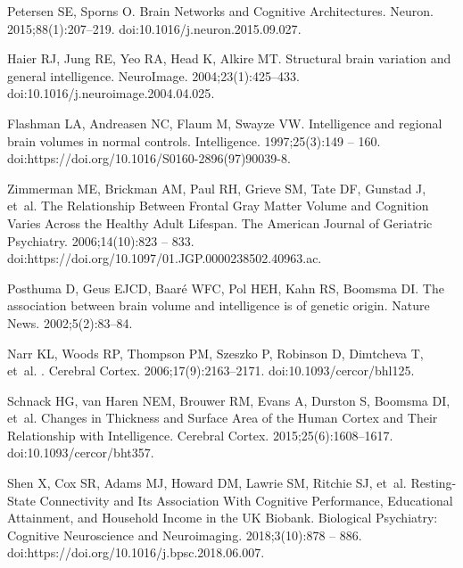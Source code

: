 \documentclass[10pt,letterpaper]{article}
\begin{document}
\begin{thebibliography}{10}

Petersen SE, Sporns O.
\newblock Brain Networks and Cognitive Architectures.
\newblock Neuron. 2015;88(1):207--219.
\newblock doi:{10.1016/j.neuron.2015.09.027}.

Haier RJ, Jung RE, Yeo RA, Head K, Alkire MT.
\newblock Structural brain variation and general intelligence.
\newblock NeuroImage. 2004;23(1):425--433.
\newblock doi:{10.1016/j.neuroimage.2004.04.025}.

Flashman LA, Andreasen NC, Flaum M, Swayze VW.
\newblock Intelligence and regional brain volumes in normal controls.
\newblock Intelligence. 1997;25(3):149 -- 160.
\newblock doi:{https://doi.org/10.1016/S0160-2896(97)90039-8}.

Zimmerman ME, Brickman AM, Paul RH, Grieve SM, Tate DF, Gunstad J, et~al.
\newblock The Relationship Between Frontal Gray Matter Volume and Cognition
  Varies Across the Healthy Adult Lifespan.
\newblock The American Journal of Geriatric Psychiatry. 2006;14(10):823 -- 833.
\newblock doi:{https://doi.org/10.1097/01.JGP.0000238502.40963.ac}.

Posthuma D, Geus EJCD, Baaré WFC, Pol HEH, Kahn RS, Boomsma DI.
\newblock The association between brain volume and intelligence is of genetic
  origin.
\newblock Nature News. 2002;5(2):83--84.

Narr KL, Woods RP, Thompson PM, Szeszko P, Robinson D, Dimtcheva T, et~al.
.
\newblock Cerebral Cortex. 2006;17(9):2163--2171.
\newblock doi:{10.1093/cercor/bhl125}.

Schnack HG, van Haren NEM, Brouwer RM, Evans A, Durston S, Boomsma DI, et~al.
\newblock Changes in {Thickness} and {Surface} {Area} of the {Human} {Cortex}
  and {Their} {Relationship} with {Intelligence}.
\newblock Cerebral Cortex. 2015;25(6):1608--1617.
\newblock doi:{10.1093/cercor/bht357}.

Shen X, Cox SR, Adams MJ, Howard DM, Lawrie SM, Ritchie SJ, et~al.
\newblock Resting-State Connectivity and Its Association With Cognitive
  Performance, Educational Attainment, and Household Income in the UK Biobank.
\newblock Biological Psychiatry: Cognitive Neuroscience and Neuroimaging.
  2018;3(10):878 -- 886.
\newblock doi:{https://doi.org/10.1016/j.bpsc.2018.06.007}.


\end{thebibliography}
\end{document}
